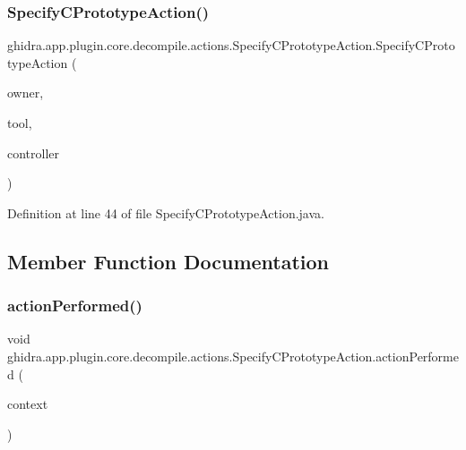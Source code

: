 \subsubsection{\texorpdfstring{SpecifyCPrototypeAction()}{SpecifyCPrototypeAction()}}
{\footnotesize\ttfamily ghidra.\+app.\+plugin.\+core.\+decompile.\+actions.\+Specify\+C\+Prototype\+Action.\+Specify\+C\+Prototype\+Action (\begin{DoxyParamCaption}\item[{String}]{owner,  }\item[{Plugin\+Tool}]{tool,  }\item[{\mbox{\hyperlink{classghidra_1_1app_1_1decompiler_1_1component_1_1_decompiler_controller}{Decompiler\+Controller}}}]{controller }\end{DoxyParamCaption})\hspace{0.3cm}{\ttfamily [inline]}}



Definition at line 44 of file Specify\+C\+Prototype\+Action.\+java.



\subsection{Member Function Documentation}
\mbox{\label{classghidra_1_1app_1_1plugin_1_1core_1_1decompile_1_1actions_1_1_specify_c_prototype_action_a5b2869ac2f0cc8c72473a5ebb5b15f6c}} 
\subsubsection{\texorpdfstring{actionPerformed()}{actionPerformed()}}
{\footnotesize\ttfamily void ghidra.\+app.\+plugin.\+core.\+decompile.\+actions.\+Specify\+C\+Prototype\+Action.\+action\+Performed (\begin{DoxyParamCaption}\item[{Action\+Context}]{context }\end{DoxyParamCaption})\hspace{0.3cm}{\ttfamily [inline]}}



